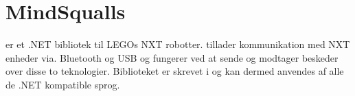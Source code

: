 \section{MindSqualls}
\mindsqualls er et .NET bibliotek til LEGOs NXT robotter.
\mindsqualls tillader kommunikation med NXT enheder via. Bluetooth og USB og fungerer ved at sende og modtager beskeder over disse to teknologier.
Biblioteket er skrevet i \csharp og kan dermed anvendes af alle de .NET kompatible sprog.


